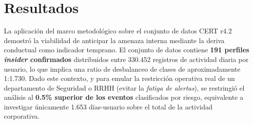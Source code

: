 \documentclass[IB]{TFUOC}%
\begin{document}
\chapter{Resultados}

La aplicación del marco metodológico sobre el conjunto de datos CERT r4.2 demostró la viabilidad de anticipar la amenaza interna mediante la deriva conductual como indicador temprano. El conjunto de datos contiene \textbf{191 perfiles \textit{insider} confirmados} distribuidos entre 330.452 registros de actividad diaria por usuario, lo que implica una ratio de desbalanceo de clases de aproximadamente 1:1.730. Dado este contexto, y para emular la restricción operativa real de un departamento de Seguridad o RRHH (evitar la \textit{fatiga de alertas}), se restringió el análisis al \textbf{0.5\% superior de los eventos} clasificados por riesgo, equivalente a investigar únicamente 1.653 días-usuario sobre el total de la actividad corporativa.
\end{document}
